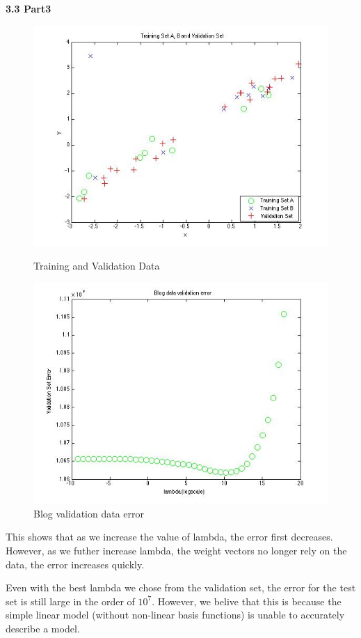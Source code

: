{\bfseries 3.3 Part3}
\begin{figure}[!htb]
  \includegraphics[width=\linewidth]{figures/p3_training_validation_data}
  \caption{Training and Validation Data}\label{fig:p3_training_validation_data}
  \endminipage\hfill
  \includegraphics[width=\linewidth]{figures/p3_blogdata_lambda}
  \caption{Blog validation data error}
  \endminipage\hfill
\end{figure}

This shows that as we increase the value of lambda, the error first decreases. However, as we futher
increase lambda, the weight vectors no longer rely on the data, the error increases quickly. 


Even with the best lambda we chose from the validation set, the error for the test set is still large
in the order of $10^{7}$. However, we belive that this is because the simple linear model (without non-linear basis functions) is unable to accurately describe a model. 

